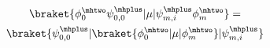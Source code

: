 %
%

\begin{multline}
   \braket{ \phi^{\mhtwo}_{0}\psi^{\mhplus}_{0, 0} | \mu | \psi^{\mhplus}_{m, i}\phi^{\mhtwo}_{m} }  = \\
    	\braket{\psi^{\mhplus}_{0, 0} | \braket{ \phi^{\mhtwo}_{0} | \mu | \phi^{\mhtwo}_{m} } | \psi^{\mhplus}_{m, i} }
\label{eq:couple_spec_osc_sep}
\end{multline}

%

